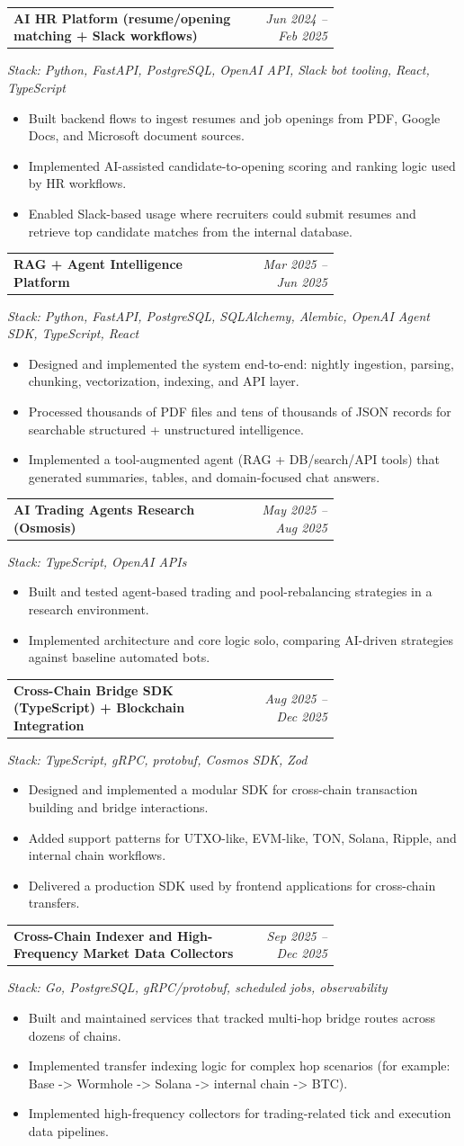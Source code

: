 \documentclass[11pt,a4paper]{article}
\makeatletter
\newcommand{\project}[4]{
  \begin{samepage}
  \vspace{0.35em}
  \noindent
  \begin{tabular*}{\linewidth}{@{}p{0.72\linewidth}@{\extracolsep{\fill}}r@{}}
    \textbf{#1} & \textit{#2} \\
  \end{tabular*}
  \textit{Stack: #3}
  \end{samepage}
  \begin{itemize}
    #4
  \end{itemize}
}
\makeatother
\begin{document}
\project
  {AI HR Platform (resume/opening matching + Slack workflows)}
  {Jun 2024 -- Feb 2025}
  {Python, FastAPI, PostgreSQL, OpenAI API, Slack bot tooling, React, TypeScript}
  {
    \item Built backend flows to ingest resumes and job openings from PDF, Google Docs, and Microsoft document sources.
    \item Implemented AI-assisted candidate-to-opening scoring and ranking logic used by HR workflows.
    \item Enabled Slack-based usage where recruiters could submit resumes and retrieve top candidate matches from the internal database.
  }

\project
  {RAG + Agent Intelligence Platform}
  {Mar 2025 -- Jun 2025}
  {Python, FastAPI, PostgreSQL, SQLAlchemy, Alembic, OpenAI Agent SDK, TypeScript, React}
  {
    \item Designed and implemented the system end-to-end: nightly ingestion, parsing, chunking, vectorization, indexing, and API layer.
    \item Processed thousands of PDF files and tens of thousands of JSON records for searchable structured + unstructured intelligence.
    \item Implemented a tool-augmented agent (RAG + DB/search/API tools) that generated summaries, tables, and domain-focused chat answers.
  }

\project
  {AI Trading Agents Research (Osmosis)}
  {May 2025 -- Aug 2025}
  {TypeScript, OpenAI APIs}
  {
    \item Built and tested agent-based trading and pool-rebalancing strategies in a research environment.
    \item Implemented architecture and core logic solo, comparing AI-driven strategies against baseline automated bots.
  }

\project
  {Cross-Chain Bridge SDK (TypeScript) + Blockchain Integration}
  {Aug 2025 -- Dec 2025}
  {TypeScript, gRPC, protobuf, Cosmos SDK, Zod}
  {
    \item Designed and implemented a modular SDK for cross-chain transaction building and bridge interactions.
    \item Added support patterns for UTXO-like, EVM-like, TON, Solana, Ripple, and internal chain workflows.
    \item Delivered a production SDK used by frontend applications for cross-chain transfers.
  }

\project
  {Cross-Chain Indexer and High-Frequency Market Data Collectors}
  {Sep 2025 -- Dec 2025}
  {Go, PostgreSQL, gRPC/protobuf, scheduled jobs, observability}
  {
    \item Built and maintained services that tracked multi-hop bridge routes across dozens of chains.
    \item Implemented transfer indexing logic for complex hop scenarios (for example: Base -> Wormhole -> Solana -> internal chain -> BTC).
    \item Implemented high-frequency collectors for trading-related tick and execution data pipelines.
  }
\end{document}
